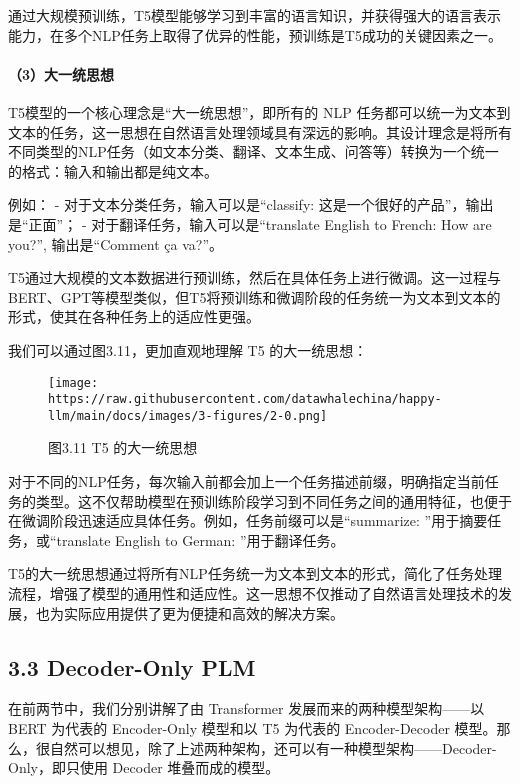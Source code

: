 \documentclass[12pt,a4paper]{book}
\begin{document}
通过大规模预训练，T5模型能够学习到丰富的语言知识，并获得强大的语言表示能力，在多个NLP任务上取得了优异的性能，预训练是T5成功的关键因素之一。

\paragraph{（3）大一统思想}\label{ux5927ux4e00ux7edfux601dux60f3}

T5模型的一个核心理念是``大一统思想''，即所有的 NLP
任务都可以统一为文本到文本的任务，这一思想在自然语言处理领域具有深远的影响。其设计理念是将所有不同类型的NLP任务（如文本分类、翻译、文本生成、问答等）转换为一个统一的格式：输入和输出都是纯文本。

例如： - 对于文本分类任务，输入可以是``classify:
这是一个很好的产品''，输出是``正面''； -
对于翻译任务，输入可以是``translate English to French: How are you?'',
输出是``Comment ça va?''。

T5通过大规模的文本数据进行预训练，然后在具体任务上进行微调。这一过程与BERT、GPT等模型类似，但T5将预训练和微调阶段的任务统一为文本到文本的形式，使其在各种任务上的适应性更强。

我们可以通过图3.11，更加直观地理解 T5 的大一统思想：

\begin{figure}[htbp]\centering
\texttt{[image: https://raw.githubusercontent.com/datawhalechina/happy-llm/main/docs/images/3-figures/2-0.png]}
\caption{图3.11 T5 的大一统思想}
\end{figure}

对于不同的NLP任务，每次输入前都会加上一个任务描述前缀，明确指定当前任务的类型。这不仅帮助模型在预训练阶段学习到不同任务之间的通用特征，也便于在微调阶段迅速适应具体任务。例如，任务前缀可以是``summarize:
''用于摘要任务，或``translate English to German: ''用于翻译任务。

T5的大一统思想通过将所有NLP任务统一为文本到文本的形式，简化了任务处理流程，增强了模型的通用性和适应性。这一思想不仅推动了自然语言处理技术的发展，也为实际应用提供了更为便捷和高效的解决方案。

\subsection{3.3 Decoder-Only PLM}\label{decoder-only-plm}

在前两节中，我们分别讲解了由 Transformer 发展而来的两种模型架构------以
BERT 为代表的 Encoder-Only 模型和以 T5 为代表的 Encoder-Decoder
模型。那么，很自然可以想见，除了上述两种架构，还可以有一种模型架构------Decoder-Only，即只使用
Decoder 堆叠而成的模型。
\end{document}

